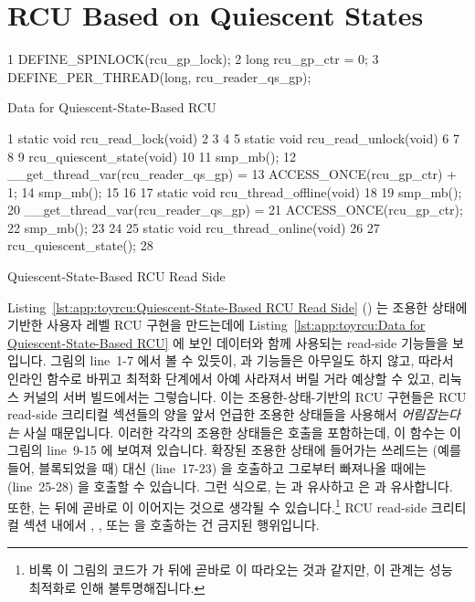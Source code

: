 \section{RCU Based on Quiescent States}
\label{sec:app:toyrcu:RCU Based on Quiescent States}

\begin{listing}[tbp]
{ \scriptsize
\begin{verbbox}
  1 DEFINE_SPINLOCK(rcu_gp_lock);
  2 long rcu_gp_ctr = 0;
  3 DEFINE_PER_THREAD(long, rcu_reader_qs_gp);
\end{verbbox}
}
\centering
\theverbbox
\caption{Data for Quiescent-State-Based RCU}
\label{lst:app:toyrcu:Data for Quiescent-State-Based RCU}
\end{listing}

\begin{listing}[tbp]
{ \scriptsize
\begin{verbbox}
  1 static void rcu_read_lock(void)
  2 {
  3 }
  4
  5 static void rcu_read_unlock(void)
  6 {
  7 }
  8
  9 rcu_quiescent_state(void)
 10 {
 11   smp_mb();
 12   __get_thread_var(rcu_reader_qs_gp) =
 13     ACCESS_ONCE(rcu_gp_ctr) + 1;
 14   smp_mb();
 15 }
 16
 17 static void rcu_thread_offline(void)
 18 {
 19   smp_mb();
 20   __get_thread_var(rcu_reader_qs_gp) =
 21     ACCESS_ONCE(rcu_gp_ctr);
 22   smp_mb();
 23 }
 24
 25 static void rcu_thread_online(void)
 26 {
 27   rcu_quiescent_state();
 28 }
\end{verbbox}
}
\centering
\theverbbox
\caption{Quiescent-State-Based RCU Read Side}
\label{lst:app:toyrcu:Quiescent-State-Based RCU Read Side}
\end{listing}

Listing~\ref{lst:app:toyrcu:Quiescent-State-Based RCU Read Side}
()
는 조용한 상태에 기반한 사용자 레벨 RCU 구현을 만드는데에
Listing~\ref{lst:app:toyrcu:Data for Quiescent-State-Based RCU} 에 보인 데이터와 함께
사용되는 read-side 기능들을 보입니다.
그림의 line~1-7 에서 볼 수 있듯이,  과
 기능들은 아무일도 하지 않고, 따라서 인라인 함수로 바뀌고
최적화 단계에서 아예 사라져서 버릴 거라 예상할 수 있고, 리눅스 커널의 서버
빌드에서는 그렇습니다.
이는 조용한-상태-기반의 RCU 구현들은 RCU read-side 크리티컬 섹션들의 양을 앞서
언급한 조용한 상태들을 사용해서 \emph{어림잡는다는} 사실 때문입니다.
이러한 각각의 조용한 상태들은  호출을 포함하는데, 이
함수는 이 그림의 line~9-15 에 보여져 있습니다.
확장된 조용한 상태에 들어가는 쓰레드는 (예를 들어, 블록되었을 때) 대신
 (line~17-23) 을 호출하고 그로부터 빠져나올 때에는
 (line~25-28) 을 호출할 수 있습니다.
그런 식으로,  는  과 유사하고
 은  과 유사합니다.
또한,  는  뒤에 곧바로
 이 이어지는 것으로 생각될 수 있습니다.\footnote{
	비록 이 그림의 코드가  가
	 뒤에 곧바로  이
	따라오는 것과 같지만, 이 관계는 성능 최적화로 인해 불투명해집니다.}
RCU read-side 크리티컬 섹션 내에서 ,
, 또는  을 호출하는 건 금지된
행위입니다.
\iffalse

